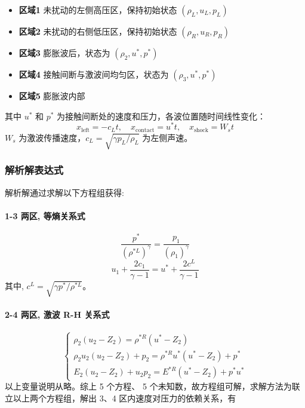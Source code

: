 \documentclass[UTF8]{ctexart}
\begin{document}
\begin{itemize}
    \item \textbf{区域1} 未扰动的左侧高压区，保持初始状态 $(\rho_L, u_L, p_L)$
    \item \textbf{区域2} 未扰动的右侧低压区，保持初始状态 $(\rho_R, u_R, p_R)$
    \item \textbf{区域3} 膨胀波后，状态为 $(\rho_2, u^*, p^*)$
    \item \textbf{区域4} 接触间断与激波间均匀区，状态为 $(\rho_3, u^*, p^*)$
    \item \textbf{区域5} 膨胀波内部
\end{itemize}

其中 $u^*$ 和 $p^*$ 为接触间断处的速度和压力，各波位置随时间线性变化：
$$x_{\text{left}} = -c_L t, \quad x_{\text{contact}} = u^* t, \quad x_{\text{shock}} = W_s t$$
$W_s$ 为激波传播速度，$c_L = \sqrt{\gamma p_L/\rho_L}$ 为左侧声速。

\subsubsection{解析解表达式}
解析解通过求解以下方程组获得:
\paragraph{1-3 两区, 等熵关系式}\cite{borges2008}
\begin{equation}
    \frac{p^{*}}{\left(\rho^{* L}\right)^{\gamma}}=\frac{p_{1}}{\left(\rho_{1}\right)^{\gamma}}
\end{equation}
\begin{equation}
u_{1}+\frac{2 c_{1}}{\gamma-1}=u^{*}+\frac{2 c^{L}}{\gamma-1}
\end{equation}
其中, $c^{L}=\sqrt{\gamma p^{*} / \rho^{* L}}$。
\paragraph{2-4 两区, 激波 R-H 关系式}
\begin{equation}
\left\{\begin{array}{l}\rho_{2}\left(u_{2}-Z_{2}\right)=\rho^{* R}\left(u^{*}-Z_{2}\right) \\\rho_{2} u_{2}\left(u_{2}-Z_{2}\right)+p_{2}=\rho^{* R} u^{*}\left(u^{*}-Z_{2}\right)+p^{*} \\E_{2}\left(u_{2}-Z_{2}\right)+u_{2} p_{2}=E^{* R}\left(u^{*}-Z_{2}\right)+p^{*} u^{*}\end{array}\right.
\end{equation}
以上变量说明从略。综上 5 个方程、 5 个未知数，故方程组可解，求解方法为联立以上两个方程组，解出 3、4 区内速度对压力的依赖关系，有
\end{document}
